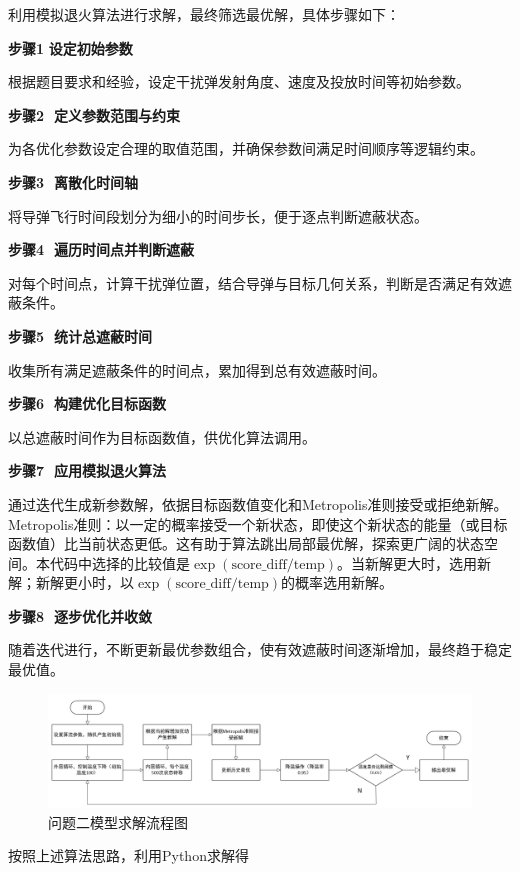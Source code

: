 \documentclass[../main.tex]{subfiles}
\begin{document}

利用模拟退火算法进行求解，最终筛选最优解，具体步骤如下：

\textbf{步骤1$\,\,$设定初始参数}

根据题目要求和经验，设定干扰弹发射角度、速度及投放时间等初始参数。

\textbf{步骤2 $\,\,$定义参数范围与约束}

为各优化参数设定合理的取值范围，并确保参数间满足时间顺序等逻辑约束。

\textbf{步骤3 $\,\,$离散化时间轴}

将导弹飞行时间段划分为细小的时间步长，便于逐点判断遮蔽状态。

\textbf{步骤4 $\,\,$遍历时间点并判断遮蔽}

对每个时间点，计算干扰弹位置，结合导弹与目标几何关系，判断是否满足有效遮蔽条件。

\textbf{步骤5 $\,\,$统计总遮蔽时间}

收集所有满足遮蔽条件的时间点，累加得到总有效遮蔽时间。

\textbf{步骤6 $\,\,$构建优化目标函数}

以总遮蔽时间作为目标函数值，供优化算法调用。

 \textbf{步骤7 $\,\,$应用模拟退火算法}
 
 通过迭代生成新参数解，依据目标函数值变化和Metropolis准则接受或拒绝新解。\\
    Metropolis准则：以一定的概率接受一个新状态，即使这个新状态的能量（或目标函数值）比当前状态更低。这有助于算法跳出局部最优解，探索更广阔的状态空间。本代码中选择的比较值是\(\exp(\text{score\_diff} / \text{temp})\)。当新解更大时，选用新解；新解更小时，以\(\exp(\text{score\_diff} / \text{temp})\)的概率选用新解。

\textbf{步骤8 $\,\,$逐步优化并收敛}

随着迭代进行，不断更新最优参数组合，使有效遮蔽时间逐渐增加，最终趋于稳定最优值。
\begin{figure}[H]
\centering
\includegraphics[scale=0.35]{问题二模型求解流程图.png}
\caption{问题二模型求解流程图}
\label{图2}
\end{figure}

按照上述算法思路，利用Python求解得
\end{document}
